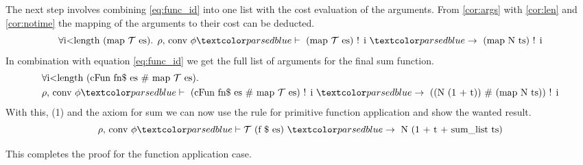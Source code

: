 The next step involves combining \ref{eq:func_id} into one list with the cost evaluation of the arguments.
From \ref{cor:args} with \ref{cor:len} and \ref{cor:notime} the mapping of the arguments to their cost can be deducted.
\begin{equation*}
  \forall \text{i<length (map } \mathcal{T}\text{ es). }\rho\text{, conv }\phi \hvdash\text{ (map }\mathcal{T}\text{ es) ! i }\hrightarrow \text{ (map N ts) ! i}
\end{equation*}
In combination with equation \ref{eq:func_id} we get the full list of arguments for the final sum function.
\begin{equation*}
  \begin{aligned}
  &\forall \text{i<length (cFun fn\$ es \# map } \mathcal{T}\text{ es). } \\
  &\rho\text{, conv }\phi \hvdash\text{ (cFun fn\$ es \# map }\mathcal{T}\text{ es) ! i }\hrightarrow \text{ ((N (1 + t)) \# (map N ts)) ! i}
  \end{aligned}
\end{equation*}
With this, (1) and the axiom for sum we can now use the rule for primitive function application and show the wanted result.
\begin{equation*}
  \rho \text{, conv } \phi \hvdash \mathcal{T}\text{ (f \$ es) }\hrightarrow\text{ N (1 + t + sum\_list ts)}
\end{equation*}

This completes the proof for the function application case.
